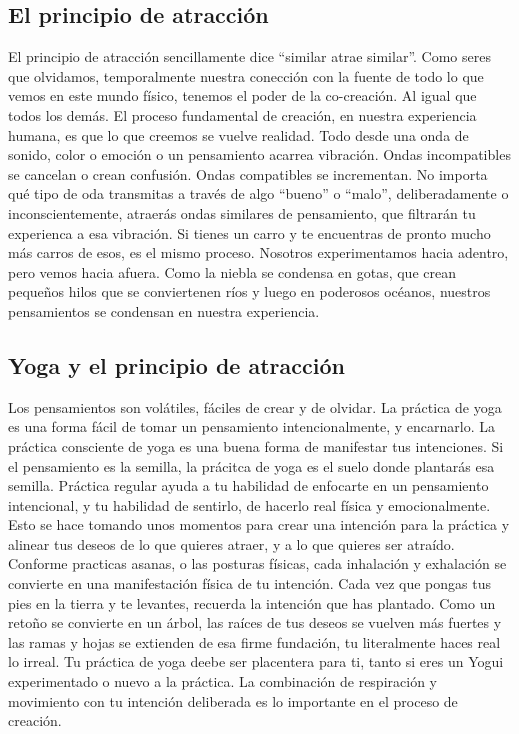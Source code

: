 \begin{itemize}
\section{El principio de atracción}
El principio de atracción sencillamente dice ``similar atrae similar''. Como seres que olvidamos, temporalmente nuestra conección con la fuente de todo lo que vemos en este mundo físico, tenemos el poder de la co-creación. Al igual que todos los demás. El proceso fundamental de creación, en nuestra experiencia humana, es que lo que creemos se vuelve realidad. Todo desde una onda de sonido, color o emoción o un pensamiento acarrea vibración. Ondas incompatibles se cancelan o crean confusión. Ondas compatibles se incrementan. No importa qu\'e tipo de oda transmitas a trav\'es de algo ``bueno'' o ``malo'', deliberadamente o inconscientemente, atraerás ondas similares de pensamiento, que filtrarán tu experienca a esa vibración. Si tienes un carro y te encuentras de pronto mucho más carros de esos, es el mismo proceso. Nosotros experimentamos hacia adentro, pero vemos hacia afuera. Como la niebla se condensa en gotas, que crean pequeños hilos que se conviertenen ríos y luego en poderosos oc\'eanos, nuestros pensamientos se condensan en nuestra experiencia.

\subsection{Yoga y el principio de atracción}
Los pensamientos son volátiles, fáciles de crear y de olvidar. La práctica de yoga es una forma fácil de tomar un pensamiento intencionalmente, y encarnarlo. La práctica consciente de yoga es una buena forma de manifestar tus intenciones. Si el pensamiento es la semilla, la prácitca de yoga es el suelo donde plantarás esa semilla. Práctica regular ayuda a tu habilidad de enfocarte en un pensamiento intencional, y tu habilidad de sentirlo, de hacerlo real física y emocionalmente. Esto se hace tomando unos momentos para crear una intención para la práctica y alinear tus deseos de lo que quieres atraer, y a lo que quieres ser atraído. Conforme practicas asanas, o las posturas físicas, cada inhalación y exhalación se convierte en una manifestación física de tu intención. Cada vez que pongas tus pies en la tierra y te levantes, recuerda la intención que has plantado. Como un retoño se convierte en un árbol, las raíces de tus deseos se vuelven más fuertes y las ramas y hojas se extienden de esa firme fundación, tu literalmente haces real lo irreal. Tu práctica de yoga deebe ser placentera para ti, tanto si eres un Yogui experimentado o nuevo a la práctica. La combinación de respiración y movimiento con tu intención deliberada es lo importante en el proceso de creación.


\end{itemize}
